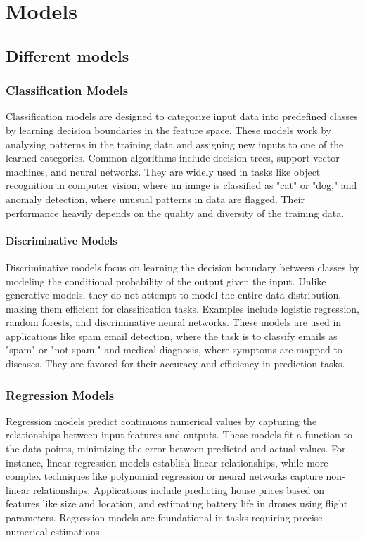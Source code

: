\chapter{Models}
\section{Different models}
\subsection{Classification Models}
Classification models are designed to categorize input data into predefined classes by learning decision boundaries in the feature space. These models work by analyzing patterns in the training data and assigning new inputs to one of the learned categories. Common algorithms include decision trees, support vector machines, and neural networks. They are widely used in tasks like object recognition in computer vision, where an image is classified as "cat" or "dog," and anomaly detection, where unusual patterns in data are flagged. Their performance heavily depends on the quality and diversity of the training data. 
    \subsubsection{Discriminative Models}
Discriminative models focus on learning the decision boundary between classes by modeling the conditional probability of the output given the input. Unlike generative models, they do not attempt to model the entire data distribution, making them efficient for classification tasks. Examples include logistic regression, random forests, and discriminative neural networks. These models are used in applications like spam email detection, where the task is to classify emails as "spam" or "not spam," and medical diagnosis, where symptoms are mapped to diseases. They are favored for their accuracy and efficiency in prediction tasks. 


\subsection{Regression Models}
Regression models predict continuous numerical values by capturing the relationships between input features and outputs. These models fit a function to the data points, minimizing the error between predicted and actual values. For instance, linear regression models establish linear relationships, while more complex techniques like polynomial regression or neural networks capture non-linear relationships. Applications include predicting house prices based on features like size and location, and estimating battery life in drones using flight parameters. Regression models are foundational in tasks requiring precise numerical estimations. 

